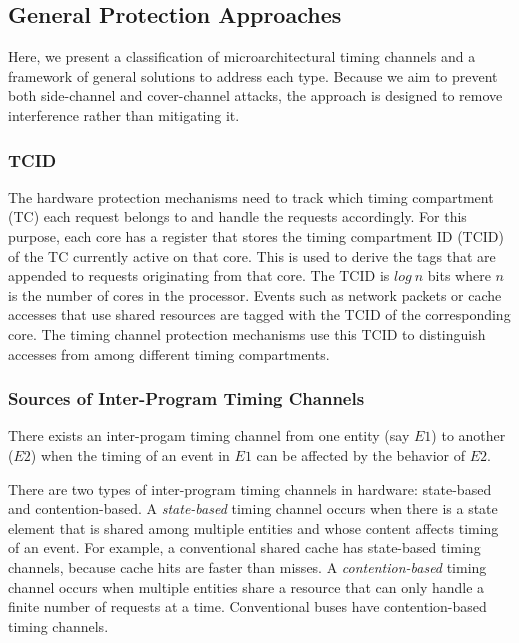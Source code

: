 \subsection{General Protection Approaches}
\label{sec:general_approaches}

Here, we present a classification of microarchitectural timing 
channels and a framework of general solutions to address each type.
Because we aim to prevent both side-channel and cover-channel attacks,
the approach is designed to remove interference rather than mitigating it.

\subsubsection{TCID}

The hardware protection mechanisms need to track which timing compartment (TC)
each request belongs to and handle the requests accordingly. 
For this purpose, each core has a register that 
stores the timing compartment ID (TCID) of the TC currently active on that 
core. This is used to derive the tags that are appended to requests originating 
from that core. The TCID is $log\ n$ bits where $n$ is the number of cores in 
the processor.
Events such as network packets or cache accesses that use shared resources are 
tagged with the TCID of the corresponding core.  The timing channel protection 
mechanisms use this TCID to distinguish accesses
from among different timing compartments.

\subsubsection{Sources of Inter-Program Timing Channels}

There exists an inter-progam timing channel from one entity (say $E1$)
to another ($E2$) when the timing of an event in $E1$ can be affected by 
the behavior of $E2$.

There are two types of inter-program timing channels in hardware: state-based
and contention-based.
A \emph{state-based} timing channel occurs when there is a state element 
that is shared among multiple entities and whose
content affects timing of an event.
For example, a conventional shared cache has state-based timing channels, 
because cache hits are faster than misses.
A \emph{contention-based} timing channel occurs when multiple entities 
share a resource that can only handle a finite number of requests at a time.
Conventional buses have contention-based timing channels.

